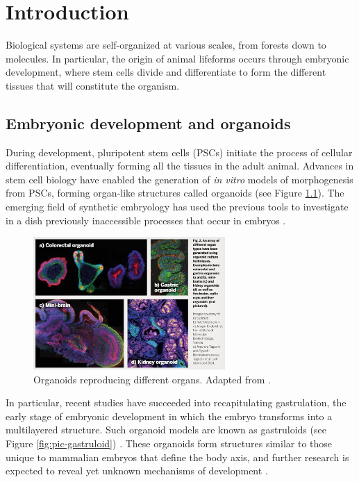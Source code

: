 \chapter{Introduction}

Biological systems are self-organized at various scales, from forests down to molecules. In particular, the origin of animal lifeforms occurs through embryonic development, where stem cells divide and differentiate to form the different tissues that will constitute the organism.



\section{Embryonic development and organoids}

During development, pluripotent stem cells (PSCs) initiate the process of cellular differentiation, eventually forming all the tissues in the adult animal. Advances in stem cell biology have enabled the generation of \textit{in vitro} models of morphogenesis from PSCs, forming organ-like structures called organoids \linebreak \parencite{Huch_2017} (see Fi\-gure \ref{fig:pic-organoids}). The emerging field of synthetic embryo\-logy has used the previous tools to investigate in a dish previously inaccessible processes that occur in embryos \parencite{Liu_2009,Serra_2019,Gritti_2021,Sullivan_2023}. 

\begin{figure}[ht]
    \centering
    \includegraphics[width=0.65\textwidth]{figures/picture-organoids.jpg}
    \caption{Organoids reproducing different organs. Adapted from \cite{Turner_2020}.}
    \label{fig:pic-organoids}
\end{figure}

In particular, recent studies have succeeded into recapitulating gastrulation, the early stage of embryonic development in which the embryo transforms into a multilayered structure. Such organoid models are known as gastruloids (see Fi\-gure \ref{fig:pic-gastruloid}) \parencite{Brink_2014,Simunovic_2017}.  These or\-ga\-noids form structures similar to those unique to mammalian embryos that define the body axis, and further research is expected to reveal yet unknown mechanisms of development \parencite{Turner_2020}.

